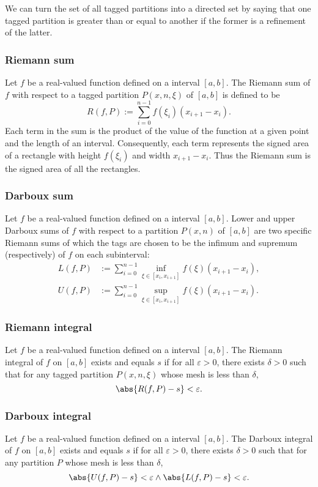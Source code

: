 \documentclass[a4paper,12pt]{report}
\begin{document}
We can turn the set of all tagged partitions into a directed set by saying that one tagged partition is greater than or equal to another if the former is a refinement of the latter.
\subsubsection{Riemann sum}
Let $f$ be a real-valued function defined on a interval $[a,b]$. The Riemann sum of $f$ with respect to a tagged partition $P(x,n,\xi)$ of $[a,b]$ is defined to be
\[R(f,P):=\sum_{i=0}^{n-1}f(\xi_i)\left(x_{i+1}-x_i\right).\]
Each term in the sum is the product of the value of the function at a given point and the length of an interval. Consequently, each term represents the signed area of a rectangle with height $f(\xi_i)$ and width $x_{i + 1} − x_i$. Thus the Riemann sum is the signed area of all the rectangles.
\subsubsection{Darboux sum}
Let $f$ be a real-valued function defined on a interval $[a,b]$. Lower and upper Darboux sums of $f$ with respect to a partition $P(x,n)$ of $[a,b]$ are two specific Riemann sums of which the tags are chosen to be the infimum and supremum (respectively) of $f$ on each subinterval:
\[\begin{aligned}
L(f,P)&:=\sum_{i=0}^{n-1}\inf_{\xi\in [x_i,x_{i+1}]}f(\xi)(x_{i+1}-x_i),\\
U(f,P)&:=\sum_{i=0}^{n-1}\sup_{\xi\in [x_i,x_{i+1}]}f(\xi)(x_{i+1}-x_i).
\end{aligned}\]
\subsubsection{Riemann integral}
Let $f$ be a real-valued function defined on a interval $[a,b]$. The Riemann integral of $f$ on $[a,b]$ exists and equals $s$ if for all $\varepsilon > 0$, there exists $\delta > 0$ such that for any tagged partition $P(x,n,\xi)$ whose mesh is less than $\delta$,
\[\abs{R(f,P)-s}<\varepsilon .\]
\subsubsection{Darboux integral}
Let $f$ be a real-valued function defined on a interval $[a,b]$. The Darboux integral of $f$ on $[a,b]$ exists and equals $s$ if for all $\varepsilon > 0$, there exists $\delta > 0$ such that for any partition $P$ whose mesh is less than $\delta$,
\[\abs{U(f,P)-s}<\varepsilon \land \abs{L(f,P)-s}<\varepsilon.\]
\end{document}

